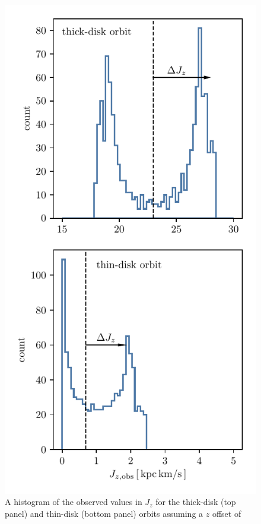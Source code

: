 \documentclass[twocolumn]{aastex62}
\begin{document}
\begin{figure}
\begin{center}
\includegraphics[width=\columnwidth]{fig/schmactions_Jz_zerr_hist.pdf}
\end{center}
\caption{A histogram of the observed values in $J_z$ for the thick-disk (top
panel) and thin-disk (bottom panel) orbits assuming a $z$ offset of
}
\end{figure}
\end{document}
